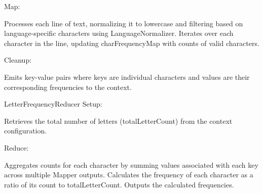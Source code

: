 Map:

Processes each line of text, normalizing it to lowercase and filtering based on language-specific characters using LanguageNormalizer.
Iterates over each character in the line, updating charFrequencyMap with counts of valid characters.

Cleanup:

Emits key-value pairs where keys are individual characters and values are their corresponding frequencies to the context.

LetterFrequencyReducer
Setup:

Retrieves the total number of letters (totalLetterCount) from the context configuration.

Reduce:

Aggregates counts for each character by summing values associated with each key across multiple Mapper outputs.
Calculates the frequency of each character as a ratio of its count to totalLetterCount.
Outputs the calculated frequencies.
